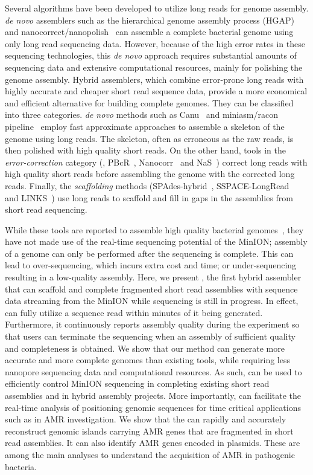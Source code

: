Several algorithms have been developed to utilize long reads for genome
assembly. \emph{de novo} assemblers such as the hierarchical genome assembly
process (HGAP)~\cite{ChinAM2013} and nanocorrect/nanopolish~\cite{LomanQS2015}
can assemble a complete bacterial genome using only long read sequencing data.
However, because of the high error rates in these sequencing technologies, this
\emph{de novo} approach requires substantial amounts of sequencing data and
extensive computational resources, mainly for polishing the genome assembly. 
Hybrid assemblers, which combine error-prone long reads with highly accurate
and cheaper short read sequence data, provide a more economical and efficient
alternative for building complete genomes. They can be classified into three
categories. \emph{de novo} methods such as Canu~\cite{BerlinKC2015} and
miniasm/racon pipeline~\cite{Vaser2017racon} employ fast approximate approaches to assemble a skeleton of the genome using long reads. The skeleton, often as erroneous as the raw reads, is then polished with high quality short reads. On the other hand, tools in the \emph{error-correction} category (\EG, PBcR~\cite{KorenSW2012}, Nanocorr~\cite{GoodwinGE2015} and NaS~\cite{MadouiEC2015}) correct long reads with high quality short reads before assembling the genome with the corrected long reads. Finally, the \emph{scaffolding} methods (SPAdes-hybrid~\cite{BankevichNA2012, AshtonND2015},
SSPACE-LongRead~\cite{BoetzerP2014, KarlssonLS2015} and LINKS~\cite{WarrenYV2015}) use long reads to scaffold and fill in gaps in the
assemblies from short read sequencing.

While these tools are reported to assemble high quality bacterial
genomes~\cite{Castro-WallaceCJ2016, IstaceFD2016}, they have not made use of
the real-time sequencing potential of the MinION; assembly of a genome can only
be performed after the sequencing is complete. This can lead to over-sequencing,
which incurs extra cost and time; or under-sequencing resulting in a low-quality
assembly. Here, we present \npscarf{}, the first hybrid assembler that can
scaffold and complete fragmented short read assemblies with sequence data
streaming from the MinION while sequencing is still in progress. 
In effect, \npscarf{} can fully utilize a sequence read within
minutes of it being generated. Furthermore, it continuously reports
assembly quality during the experiment so that users can terminate the sequencing 
when an assembly of sufficient quality and completeness is obtained.
We show that our method can generate more accurate and more
complete genomes than existing tools, while requiring less nanopore sequencing
data and computational resources. As such, \npscarf{} can be used to efficiently
control MinION sequencing in completing existing short read assemblies and in
hybrid assembly projects. More importantly, \npscarf{} can facilitate the
real-time analysis of positioning genomic sequences for time critical
applications such as in AMR investigation.
We show that the \npscarf{} can rapidly and accurately reconstruct genomic islands
carrying AMR genes that are fragmented in short read assemblies. It can also
identify AMR genes encoded in plasmids. These are among the main analyses to
understand the acquisition of AMR in pathogenic bacteria.


